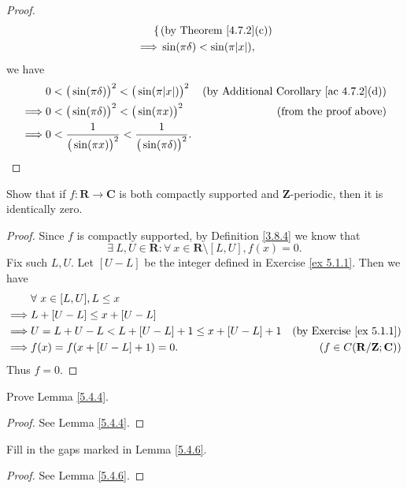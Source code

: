 \begin{proof}
\begin{align*}
\begin{cases}
        \end{cases}             & \text{(by Theorem \ref{4.7.2}(c))} \\
        \implies & \sin(\pi \delta) < \sin(\pi \abs*{x}),
    \end{align*}
    we have
    \begin{align*}
                 & 0 < \big(\sin(\pi \delta)\big)^2 < \big(\sin(\pi \abs*{x})\big)^2               & \text{(by Additional Corollary \ref{ac 4.7.2}(d))} \\
        \implies & 0 < \big(\sin(\pi \delta)\big)^2 < \big(\sin(\pi x)\big)^2                      & \text{(from the proof above)}                      \\
        \implies & 0 < \frac{1}{\big(\sin(\pi x)\big)^2} < \frac{1}{\big(\sin(\pi \delta)\big)^2}.
    \end{align*}
\end{proof}

\exercisesection

\begin{exercise}\label{ex 5.4.1}
    Show that if \(f : \mathbf{R} \to \mathbf{C}\) is both compactly supported and \(\mathbf{Z}\)-periodic, then it is identically zero.
\end{exercise}

\begin{proof}
    Since \(f\) is compactly supported, by Definition \ref{3.8.4} we know that
    \[
        \exists\ L, U \in \mathbf{R} : \forall\ x \in \mathbf{R} \setminus [L, U], f(x) = 0.
    \]
    Fix such \(L, U\).
    Let \([U - L]\) be the integer defined in Exercise \ref{ex 5.1.1}.
    Then we have
    \begin{align*}
                 & \forall\ x \in [L, U], L \leq x                                                                        \\
        \implies & L + [U - L] \leq x + [U - L]                                                                           \\
        \implies & U = L + U - L < L + [U - L] + 1 \leq x + [U - L] + 1 & \text{(by Exercise \ref{ex 5.1.1})}             \\
        \implies & f(x) = f(x + [U - L] + 1) = 0.                       & (f \in C(\mathbf{R} / \mathbf{Z} ; \mathbf{C}))
    \end{align*}
    Thus \(f = 0\).
\end{proof}

\begin{exercise}\label{ex 5.4.2}
    Prove Lemma \ref{5.4.4}.
\end{exercise}

\begin{proof}
    See Lemma \ref{5.4.4}.
\end{proof}

\begin{exercise}\label{ex 5.4.3}
    Fill in the gaps marked in Lemma \ref{5.4.6}.
\end{exercise}

\begin{proof}
    See Lemma \ref{5.4.6}.
\end{proof}